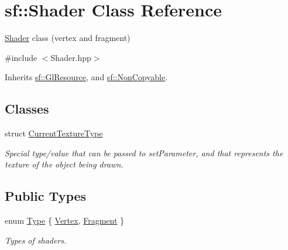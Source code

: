 \hypertarget{classsf_1_1_shader}{\section{sf\+:\+:Shader Class Reference}
\label{classsf_1_1_shader}
}


\hyperlink{classsf_1_1_shader}{Shader} class (vertex and fragment)  




{\ttfamily \#include $<$Shader.\+hpp$>$}



Inherits \hyperlink{classsf_1_1_gl_resource}{sf\+::\+Gl\+Resource}, and \hyperlink{classsf_1_1_non_copyable}{sf\+::\+Non\+Copyable}.

\subsection*{Classes}
\begin{DoxyCompactItemize}
\item 
struct \hyperlink{structsf_1_1_shader_1_1_current_texture_type}{Current\+Texture\+Type}
\begin{DoxyCompactList}\small\item\em Special type/value that can be passed to set\+Parameter, and that represents the texture of the object being drawn. \end{DoxyCompactList}\end{DoxyCompactItemize}
\subsection*{Public Types}
\begin{DoxyCompactItemize}
\item 
enum \hyperlink{classsf_1_1_shader_afaa1aa65e5de37b74d047da9def9f9b3}{Type} \{ \hyperlink{classsf_1_1_shader_afaa1aa65e5de37b74d047da9def9f9b3a8718008f827eb32e29bbdd1791c62dce}{Vertex}, 
\hyperlink{classsf_1_1_shader_afaa1aa65e5de37b74d047da9def9f9b3ace6e88eec3a56b2e55ee3c8e64e9b89a}{Fragment}
 \}
\begin{DoxyCompactList}\small\item\em Types of shaders. \end{DoxyCompactList}\end{DoxyCompactItemize}
